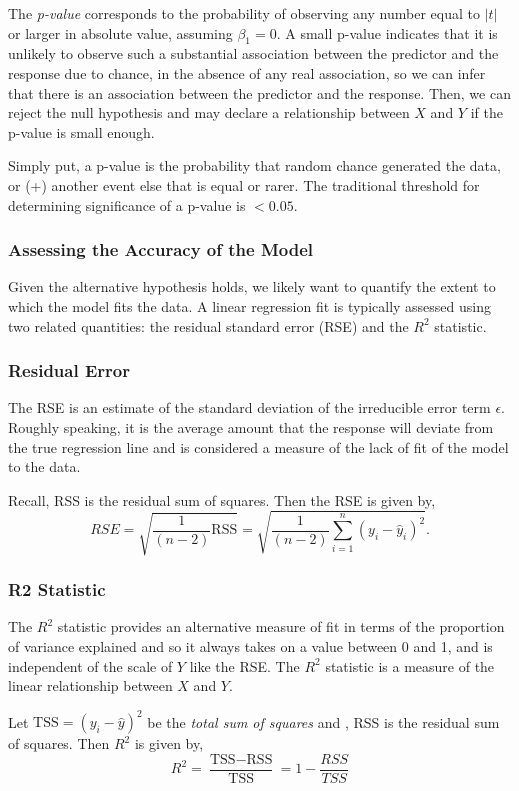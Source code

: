 \documentclass{article}
\begin{document}
The \textit{p-value} corresponds to the probability of observing any number equal to $|t|$ or larger in absolute value, assuming $\beta_1= 0$. A small p-value indicates that it is unlikely to observe such a substantial association between the predictor and the response due to chance, in the absence of any real association, so we can infer that there is an association between the predictor and the response. Then, we can reject the null hypothesis and may declare a relationship between $X$ and $Y$ if the p-value is small enough.

Simply put, a p-value is the probability that random chance generated the data, or (+) another event else that is equal or rarer. The traditional threshold for determining significance of a p-value is $< 0.05$.

\subsubsection{Assessing the Accuracy of the Model}
Given the alternative hypothesis holds, we likely want to quantify the extent to which the model fits the data. A linear regression fit is typically assessed using two related quantities: the residual standard error (RSE) and the $R^2$ statistic.

\subsubsection*{Residual Error}
The RSE is an estimate of the standard deviation of the irreducible error term $\epsilon$. Roughly speaking, it is the average amount that the response
will deviate from the true regression line and is considered a measure of the lack of fit of the model to the data. 

Recall, RSS is the residual sum of squares. Then the RSE is given by,
\[
    RSE = \sqrt{\frac{1}{(n-2)} \text{RSS} } 
    = \sqrt{\frac{1}{(n-2)} \sum_{i=1}^n (y_i - \hat y_i)^2 }.
\]

\subsubsection*{R2 Statistic} 
The $R^2$ statistic provides an alternative measure of fit in terms of the proportion of variance explained and so it always takes on a value between 0 and 1, and is independent of the scale of $Y$ like the RSE. The $R^2$ statistic is a measure of the linear relationship between $X$ and $Y$.

Let $\text{TSS} = (y_i - \hat y)^2$ be the \textit{total sum of squares} and , RSS is the residual sum of squares. Then $R^2$ is given by,
\[
    R^2 =  \frac{\text{TSS} - \text{RSS}}{\text{TSS}} = 1 - \frac{RSS}{TSS}
\]
\end{document}
